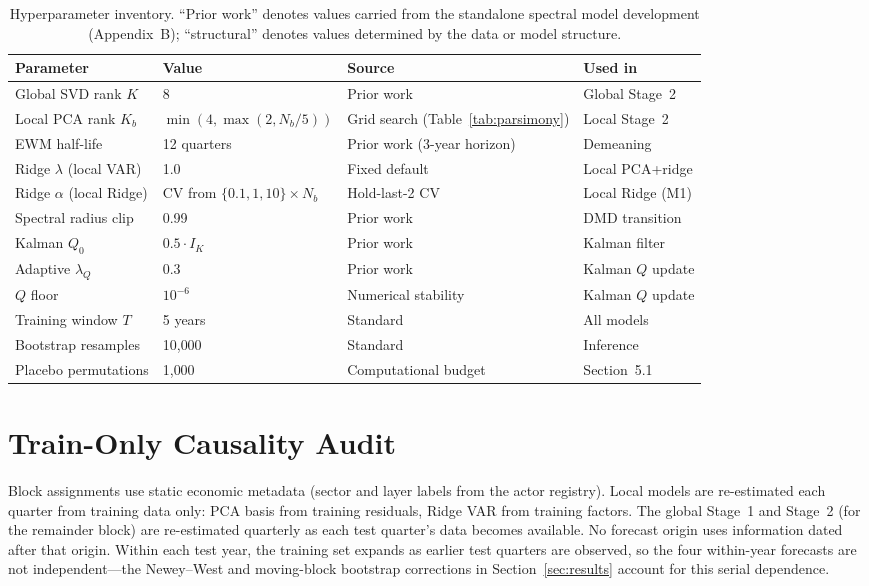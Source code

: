 \documentclass[11pt,a4paper]{article}
\begin{document}
\begin{table}[H]
\centering
\caption{Hyperparameter inventory. ``Prior work'' denotes values carried from the standalone spectral model development (Appendix~B); ``structural'' denotes values determined by the data or model structure.}
\label{tab:hyperparams}
\small
\begin{tabular}{llll}
\toprule
Parameter & Value & Source & Used in \\
\midrule
Global SVD rank $K$ & 8 & Prior work & Global Stage~2 \\
Local PCA rank $K_b$ & $\min(4, \max(2, N_b/5))$ & Grid search (Table~\ref{tab:parsimony}) & Local Stage~2 \\
EWM half-life & 12 quarters & Prior work (3-year horizon) & Demeaning \\
Ridge $\lambda$ (local VAR) & 1.0 & Fixed default & Local PCA+ridge \\
Ridge $\alpha$ (local Ridge) & CV from $\{0.1, 1, 10\} \times N_b$ & Hold-last-2 CV & Local Ridge (M1) \\
Spectral radius clip & 0.99 & Prior work & DMD transition \\
Kalman $Q_0$ & $0.5 \cdot I_K$ & Prior work & Kalman filter \\
Adaptive $\lambda_Q$ & 0.3 & Prior work & Kalman $Q$ update \\
$Q$ floor & $10^{-6}$ & Numerical stability & Kalman $Q$ update \\
Training window $T$ & 5 years & Standard & All models \\
Bootstrap resamples & 10{,}000 & Standard & Inference \\
Placebo permutations & 1{,}000 & Computational budget & Section~5.1 \\
\bottomrule
\end{tabular}
\end{table}

\section{Train-Only Causality Audit}
\label{app:causality}

Block assignments use static economic metadata (sector and layer labels from the actor registry). Local models are re-estimated each quarter from training data only: PCA basis from training residuals, Ridge VAR from training factors. The global Stage~1 and Stage~2 (for the remainder block) are re-estimated quarterly as each test quarter's data becomes available. No forecast origin uses information dated after that origin. Within each test year, the training set expands as earlier test quarters are observed, so the four within-year forecasts are not independent---the Newey--West and moving-block bootstrap corrections in Section~\ref{sec:results} account for this serial dependence.
\end{document}
